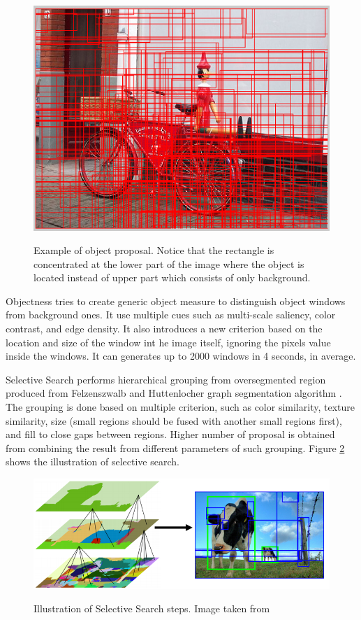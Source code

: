 \documentclass[a4paper,11pt]{kth-mag}
\begin{document}
\begin{figure}[h]
\centering
\includegraphics[scale=0.5]{image/proposal.png}
\label{fig:proposal}
\caption{Example of object proposal. Notice that the rectangle is concentrated at the lower part of the image where the object is located instead of upper part which consists of only background.}
\end{figure}

Objectness \cite{alexe2012objectness} tries to create generic object measure to distinguish object windows from background ones. It use multiple cues such as multi-scale saliency, color contrast, and edge density. It also introduces a new criterion based on the location and size of the window int he image itself, ignoring the pixels value inside the windows. It can generates up to 2000 windows in 4 seconds, in average.

Selective Search \cite{selectivesearch} performs hierarchical grouping from oversegmented region produced from Felzenszwalb and Huttenlocher graph segmentation algorithm \cite{felzenszwalb}. The grouping is done based on multiple criterion, such as color similarity, texture similarity, size (small regions should be fused with another small regions first), and fill to close gaps between regions. Higher number of proposal is obtained from combining the result from different parameters of such grouping. Figure \ref{fig:selective_search} shows the illustration of selective search.

\begin{figure}[h]
\centering
\includegraphics[scale=0.5]{image/selective_search.png}
\label{fig:selective_search}
\caption{Illustration of Selective Search steps. Image taken from \cite{uijlings2014selective}}
\end{figure}
\end{document}
